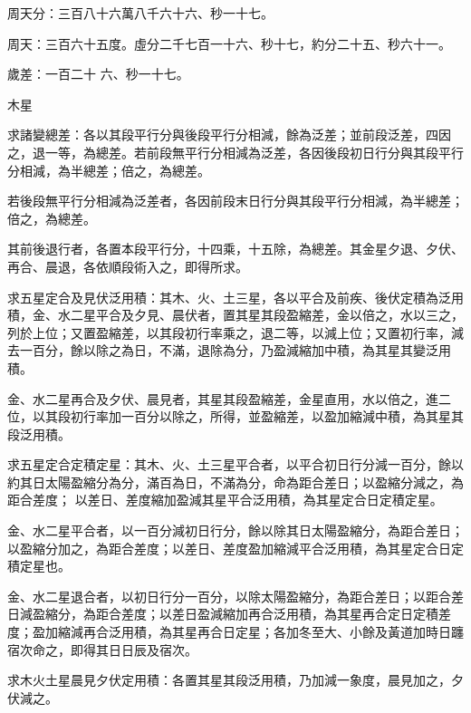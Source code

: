 \begin{pinyinscope}
 周天分：三百八十六萬八千六十六、秒一十七。



 周天：三百六十五度。虛分二千七百一十六、秒十七，約分二十五、秒六十一。



 歲差：一百二十
 六、秒一十七。



 木星



 求諸變總差：各以其段平行分與後段平行分相減，餘為泛差；並前段泛差，四因之，退一等，為總差。若前段無平行分相減為泛差，各因後段初日行分與其段平行分相減，為半總差；倍之，為總差。



 若後段無平行分相減為泛差者，各因前段末日行分與其段平行分相減，為半總差；倍之，為總差。



 其前後退行者，各置本段平行分，十四乘，十五除，為總差。其金星夕退、夕伏、再合、晨退，各依順段術入之，即得所求。



 求五星定合及見伏泛用積：其木、火、土三星，各以平合及前疾、後伏定積為泛用積，金、水二星平合及夕見、晨伏者，置其星其段盈縮差，金以倍之，水以三之，列於上位；又置盈縮差，以其段初行率乘之，退二等，以減上位；又置初行率，減去一百分，餘以除之為日，不滿，退除為分，乃盈減縮加中積，為其星其變泛用積。



 金、水二星再合及夕伏、晨見者，其星其段盈縮差，金星直用，水以倍之，進二位，以其段初行率加一百分以除之，所得，並盈縮差，以盈加縮減中積，為其星其段泛用積。



 求五星定合定積定星：其木、火、土三星平合者，以平合初日行分減一百分，餘以約其日太陽盈縮分為分，滿百為日，不滿為分，命為距合差日；以盈縮分減之，為距合差度；
 以差日、差度縮加盈減其星平合泛用積，為其星定合日定積定星。



 金、水二星平合者，以一百分減初日行分，餘以除其日太陽盈縮分，為距合差日；以盈縮分加之，為距合差度；以差日、差度盈加縮減平合泛用積，為其星定合日定積定星也。



 金、水二星退合者，以初日行分一百分，以除太陽盈縮分，為距合差日；以距合差日減盈縮分，為距合差度；以差日盈減縮加再合泛用積，為其星再合定日定積差度；盈加縮減再合泛用積，為其星再合日定星；各加冬至大、小餘及黃道加時日躔宿次命之，即得其日日辰及宿次。



 求木火土星晨見夕伏定用積：各置其星其段泛用積，乃加減一象度，晨見加之，夕伏減之。




\end{pinyinscope}
